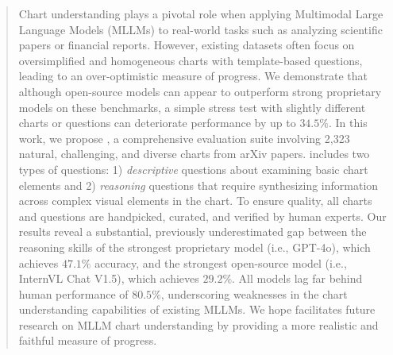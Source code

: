\vspace{-3ex}
\begin{abstract}
\label{abstract}
Chart understanding plays a pivotal role when applying Multimodal Large Language Models (MLLMs) to real-world tasks such as analyzing scientific papers or financial reports. However, existing datasets often focus on oversimplified and homogeneous charts with template-based questions, leading to an over-optimistic measure of progress. We demonstrate that although open-source models can appear to outperform strong proprietary models on these benchmarks, a simple stress test with slightly different charts or questions can deteriorate performance by up to $34.5\%$. In this work, we propose {\ours{}}, a comprehensive evaluation suite involving 2,323 natural, challenging, and diverse charts from arXiv papers. \ours{} includes two types of questions: 1) \emph{descriptive} questions about examining basic chart elements and 2) \emph{reasoning} questions that require synthesizing information across complex visual elements in the chart. To ensure quality, all charts and questions are handpicked, curated, and verified by human experts. Our results reveal a substantial, previously underestimated gap between the reasoning skills of the strongest proprietary model (i.e., GPT-4o), which achieves $47.1\%$ accuracy, and the strongest open-source model (i.e., InternVL Chat V1.5), which achieves $29.2\%$. All models lag far behind human performance of $80.5\%$, underscoring weaknesses in the chart understanding capabilities of existing MLLMs. We hope \ours{} facilitates future research on MLLM chart understanding by providing a more realistic and faithful measure of progress.
\end{abstract}
